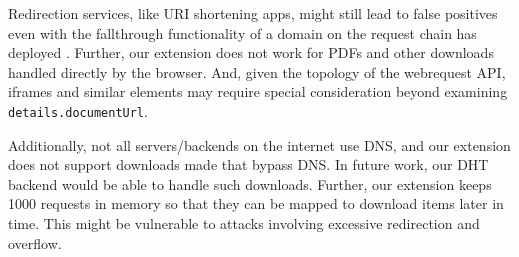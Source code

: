 Redirection services, like URI shortening apps, might still lead to false
positives even with the fallthrough functionality of a domain on the request
chain has deployed \SYSTEM{}. Further, our extension does not work for PDFs and
other downloads handled directly by the browser. And, given the topology of the
webrequest API, iframes and similar elements may require special consideration
beyond examining \texttt{details.documentUrl}.

Additionally, not all servers/backends on the internet use DNS, and our
extension does not support downloads made that bypass DNS. In future work, our
DHT backend would be able to handle such downloads. Further, our extension keeps
1000 requests in memory so that they can be mapped to download items later in
time. This might be vulnerable to attacks involving excessive redirection and
overflow.
